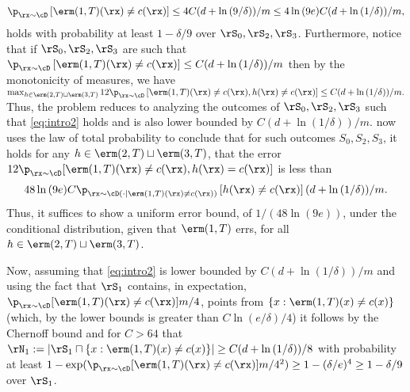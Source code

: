 \begin{align}\label{eq:intro2}
 \p_{\rx\sim\cD}\left[\erm(1,T)(\rx)\not=c(\rx)\right]\leq 4C(d+\ln{\left(9/\delta \right)})/m \leq 4\ln{\left(9e \right)}C(d+\ln{\left(1/\delta \right)})/m, 
\end{align}
holds with probability at least $1-\delta/9$ over $\rS_{0},\rS_{2},\rS_{3}$.
Furthermore, notice that if $\rS_{0},\rS_{2},\rS_{3}$ are such that $
    \p_{\rx\sim\cD}\left[\erm(1,T)(\rx)\not=c(\rx)\right]\leq C(d+\ln{\left(1/\delta \right)})/m $  then by the monotonicity of measures, we have
    $\max_{h\in \erm(2,T)\sqcup\erm(3,T)}    12\p_{\rx\sim\cD}\left[\erm(1,T)(\rx)\not= c(\rx),h(\rx)\not=c(\rx)\right] \leq C(d+\ln{\left(1/\delta \right)})/m.$ 
Thus, the problem reduces to analyzing the outcomes of $\rS_{0},\rS_{2},\rS_{3}$ such that \cref{eq:intro2} holds and is also lower bounded by $ C(d+\ln{\left(1/\delta \right)})/m .$ 
\citeauthor{hannekeoptimal} now uses the law of total probability to conclude that for such outcomes $ S_0,S_2,S_3 $, it holds for any $h\in \erm(2,T)\sqcup\erm(3,T)$, that the error $12\p_{\rx\sim\cD}[\erm(1,T)(\rx)\not= c(\rx),h(\rx)=c(\rx)]$ is less than 
\begin{align}\label{eq:intro4}
48\ln{\left(9e \right)}C \p_{\rx\sim\cD(\cdot \mid \erm(1,T)(\rx)\not=c(\rx))}\left[h(\rx)\not=c(\rx)\right] (d+ \ln{\left(1/\delta \right)}) /m.
    \end{align}
Thus, it suffices to show a uniform error bound, of $1/(48\ln{\left(9e \right)})$, under the conditional distribution, given that $\erm(1,T)$ errs, for all $h\in \erm(2,T)\sqcup\erm(3,T)$.

Now, assuming that \cref{eq:intro2} is lower bounded by $ C(d+\ln{\left(1/\delta \right)})/m $  and using the fact that $\rS_{1}$ contains, in expectation,
$\p_{\rx\sim\cD}[\erm(1,T)(\rx)\not=c(\rx)]m/4$, points from $\{x: \erm(1,T)(x)\not=c(x) \}$ (which, by the lower bounds is  greater than $C\ln{( e/\delta )}/4$) it follows by the Chernoff bound and for $C>64$ that $\rN_{1}:=|\rS_{1}\sqcap \{x: \erm(1,T)(x)\not=c(x) \}|\geq C(d+ \ln{(1/\delta )} )/8$ with probability at least 
$1-\exp(\p_{\rx\sim\cD}[\erm(1,T)(\rx)\not=c(\rx)]m/4^2)\geq 1-(\delta/e)^{4}\geq 1-\delta/9$  over $\rS_{1}$. 

